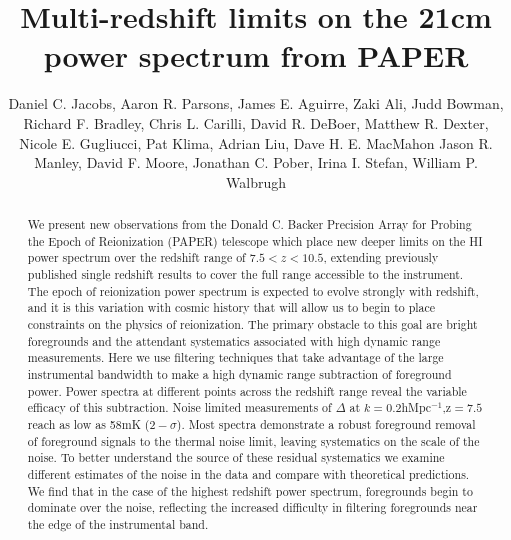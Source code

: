 \documentclass[preprint]{aastex}
\begin{document}
\title{Multi-redshift limits on the 21cm power spectrum from PAPER}
\author{
Daniel C. Jacobs,
Aaron R. Parsons,
James E. Aguirre,
Zaki Ali,
Judd Bowman,
Richard F. Bradley,
Chris L.  Carilli,
David R. DeBoer,
Matthew R. Dexter,
Nicole E. Gugliucci,
Pat Klima,
Adrian Liu,
Dave H. E. MacMahon
Jason R. Manley,
David F. Moore,
Jonathan C. Pober,
Irina I. Stefan,
William P. Walbrugh}


\begin{abstract}
We present new observations from the Donald C. Backer Precision Array for Probing the Epoch of Reionization (PAPER) telescope which place new deeper limits on the HI power spectrum over the redshift range of $7.5<z<10.5$, extending previously published single redshift results to cover the full range accessible to the instrument. The epoch of reionization power spectrum is expected to evolve strongly with redshift, and it is this variation with cosmic history that will allow us to begin to place constraints on the physics of reionization.  The primary obstacle to this goal are bright foregrounds and the attendant systematics associated with high dynamic range measurements. Here we use filtering techniques that take advantage of the large instrumental bandwidth to make a high dynamic range subtraction of foreground power.  Power spectra at different points across the redshift range reveal the variable efficacy of this subtraction.  Noise limited measurements of $\Delta$ at $k=$0.2hMpc$^{-1}$,z$=7.5$ reach as low as 58mK ($2-\sigma$).  Most spectra demonstrate a robust foreground removal of foreground signals to the thermal noise limit, leaving systematics on the scale of the noise. To better understand the source of these residual systematics we examine different estimates of the noise in the data and compare with theoretical predictions. We find that in the case of the highest redshift power spectrum, foregrounds begin to dominate over the noise, reflecting the increased difficulty in filtering foregrounds near the edge of the instrumental band.
\end{abstract}
\end{document}
